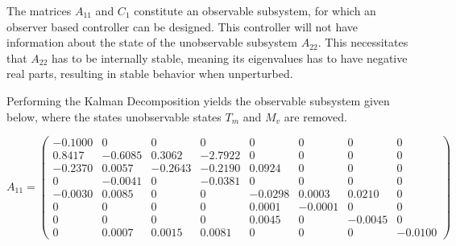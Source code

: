 The matrices $A_{11}$ and $C_{1}$ constitute an observable subsystem, for which an observer based controller can be designed. This controller will not have information about the state of the unobservable subsystem $A_{22}$. This necessitates that $A_{22}$ has to be internally stable, meaning its eigenvalues has to have negative real parts, resulting in stable behavior when unperturbed.

Performing the Kalman Decomposition yields the observable subsystem given below, where the states unobservable states $ T_m $ and $ M_v $ are removed.

\begin{equation}  \label{eq:A11}
	A_{11} = \left(\begin{array}{cccccccc}
		-0.1000 &        0 &        0 &        0 &        0 &        0 &        0 &        0  \\
		0.8417 &  -0.6085 &   0.3062 &  -2.7922 &        0 &        0 &        0 &        0  \\
		-0.2370 &   0.0057 &  -0.2643 &  -0.2190 &   0.0924 &        0 &        0 &        0  \\
		0 &  -0.0041 &        0 &  -0.0381 &        0 &        0 &        0 &        0  \\
		-0.0030 &   0.0085 &        0 &        0 &  -0.0298 &   0.0003 &   0.0210 &        0  \\
		0 &        0 &        0 &        0 &   0.0001 &  -0.0001 &        0 &        0  \\
		0 &        0 &        0 &        0 &   0.0045 &        0 &  -0.0045 &        0  \\
		0 &   0.0007 &   0.0015 &   0.0081 &        0 &        0 &        0 &  -0.0100
	\end{array}\right)
\end{equation}

\bigskip


